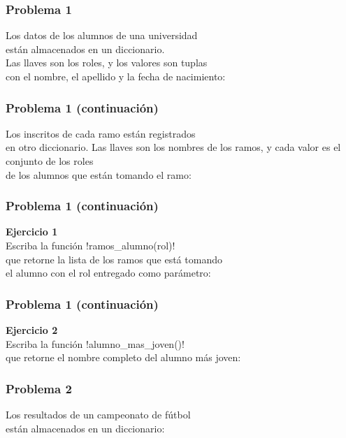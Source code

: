 \documentclass[12pt]{beamer}
\begin{document}
  \begin{frame}
    \frametitle{Problema 1}
    \label{problema-alumnos-1}
    Los datos de los alumnos de una universidad \\
    están almacenados en un diccionario. \\
    Las llaves son los roles,
    y los valores son tuplas \\
    con el nombre, el apellido
    y la fecha de nacimiento: \\
    \tiny
    
  \end{frame}

  \begin{frame}
    \frametitle{Problema 1 (continuación)}
    \label{problema-alumnos-2}
    Los inscritos de cada ramo están registrados \\
    en otro diccionario. Las llaves son los nombres de los ramos,
    y cada valor es el conjunto de los roles \\
    de los alumnos que están tomando el ramo:
    \tiny
    
  \end{frame}

  \begin{frame}
    \frametitle{Problema 1 (continuación)}
    \label{problema-alumnos-3}
    \textbf{Ejercicio 1} \\
    Escriba la función \li!ramos_alumno(rol)! \\
    que retorne la lista de los ramos que está tomando \\
    el alumno con el rol entregado como parámetro:
    
  \end{frame}

  \begin{frame}
    \frametitle{Problema 1 (continuación)}
    \label{problema-alumnos-4}
    \textbf{Ejercicio 2} \\
    Escriba la función \li!alumno_mas_joven()! \\
    que retorne el nombre completo del alumno más joven:
    
  \end{frame}

  \begin{frame}
    \frametitle{Problema 2}
    \label{problema-futbol-1}
    Los resultados de un campeonato de fútbol \\
    están almacenados en un diccionario:
    
  \end{frame}
\end{document}
